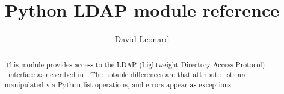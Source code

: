 \documentclass{manual}
\title{Python LDAP module reference}
\author{David Leonard}
\begin{document}
\maketitle

\begin{abstract}

 \noindent
This module provides access to the LDAP 
(Lightweight Directory Access Protocol) \C\ interface
as described in . 
The notable differences are that attribute lists are manipulated via Python
list operations, and errors appear as exceptions.

\end{abstract}

\tableofcontents


\end{document}
